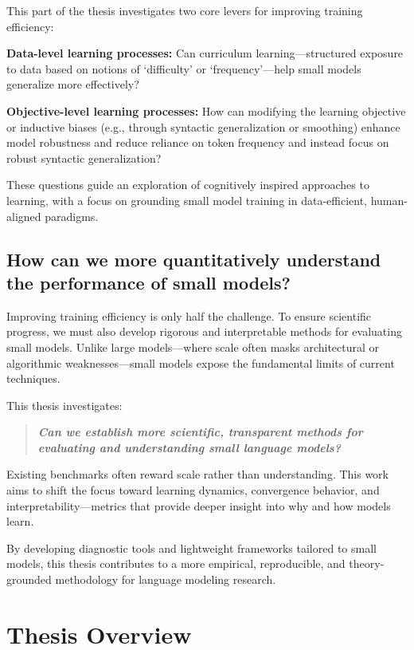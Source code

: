 This part of the thesis investigates two core levers for improving training efficiency:

\textbf{Data-level learning processes:} Can curriculum learning—structured exposure to data based on notions of `difficulty' or `frequency'—help small models generalize more effectively?

\textbf{Objective-level learning processes:} How can modifying the learning objective or inductive biases (e.g., through syntactic generalization or smoothing) enhance model robustness and reduce reliance on token frequency and instead focus on robust syntactic generalization?

These questions guide an exploration of cognitively inspired approaches to learning, with a focus on grounding small model training in data-efficient, human-aligned paradigms.

\subsection{How can we more quantitatively understand the performance of small models?}

Improving training efficiency is only half the challenge. To ensure scientific progress, we must also develop rigorous and interpretable methods for evaluating small models. Unlike large models—where scale often masks architectural or algorithmic weaknesses—small models expose the fundamental limits of current techniques.

This thesis investigates:

\begin{quote}
    \textbf{\emph{Can we establish more scientific, transparent methods for evaluating and understanding small language models?}}
\end{quote}

Existing benchmarks often reward scale rather than understanding. This work aims to shift the focus toward learning dynamics, convergence behavior, and interpretability—metrics that provide deeper insight into why and how models learn.

By developing diagnostic tools and lightweight frameworks tailored to small models, this thesis contributes to a more empirical, reproducible, and theory-grounded methodology for language modeling research.

\section*{Thesis Overview}

